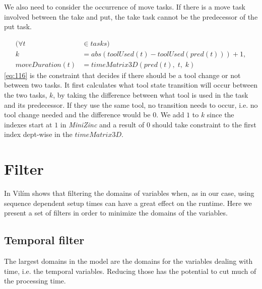  We also need to consider the occurrence of move tasks. If there is a move task involved between the take and put, the take task cannot be the predecessor of the put task.
 
 \begin{equation}\label{eq:116}
 \begin{aligned}
 (\forall t &\in tasks) \\
 k &= abs(toolUsed(t) - toolUsed(pred(t))) + 1, \\
 moveDuration(t) &= timeMatrix3D(pred(t), \; t, \; k)
 \end{aligned}
 \end{equation}
\ref{eq:116} is the constraint that decides if there should be a tool change or not between two tasks. It first calculates what tool state transition will occur between the two tasks, $k$, by taking the difference between what tool is used in the task and its predecessor. If they use the same tool, no transition needs to occur, i.e. no tool change needed and the difference would be $0$. We add $1$ to $k$ since the indexes start at $1$ in \emph{MiniZinc} and a result of $0$ should take constraint to the first index dept-wise in the $timeMatrix3D$.
 

 
 
 \section{Filter}
  In \cite{VilimBartak2002Batch} \cite{Vilim2002Precedence} \cite{VilimBartak2002Sequence} Vilím shows that filtering the domains of variables when, as in our case, using sequence dependent setup times can have a great effect on the runtime. Here we present a set of filters in order to minimize the domains of the variables.
  
\subsection{Temporal filter}
  The largest domains in the model are the domains for the variables dealing with time, i.e. the temporal variables. Reducing those has the potential to cut much of the processing time.
  
